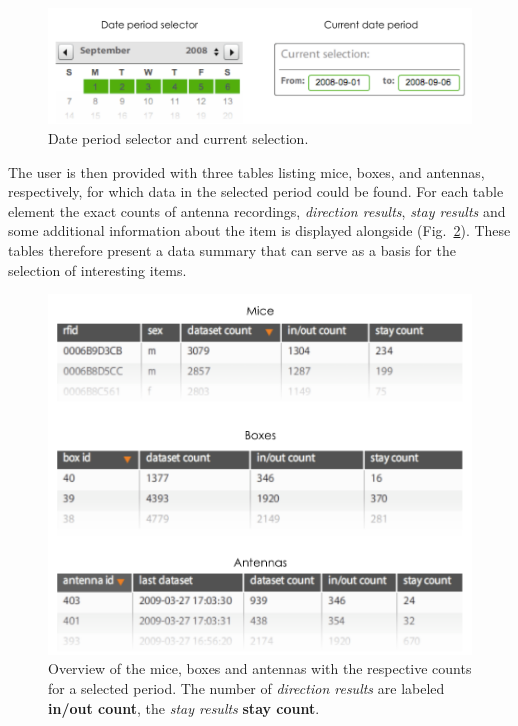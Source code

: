 \begin{figure}[htpb]
\begin{center}
  \includegraphics[width=.75\textwidth]{assets/pdf/date_period.pdf}
  \caption[Date period selector]{Date period selector and current selection.}
  \label{fig:date_period}
\end{center}
\end{figure}

The user is then provided with three tables listing mice, boxes, and antennas, respectively, for which data in the selected period could be found. For each table element the exact counts of antenna recordings, \textit{direction results}, \textit{stay results} and some additional information about the item is displayed alongside (Fig.~\ref{fig:data_overview_with_count}). These tables therefore present a data summary that can serve as a basis for the selection of interesting items. 

\begin{figure}[!hbpt]
\begin{center}
  \includegraphics[width=.66\textwidth]{assets/pdf/overview_list.pdf}
  \caption[Overview of the summarized data for mice, boxes and antennas within a date period]{Overview of the mice, boxes and antennas with the respective counts for a selected period. The number of \textit{direction results} are labeled \textbf{in/out count}, the \textit{stay results}  \textbf{stay count}.}
  \label{fig:data_overview_with_count}
\end{center}
\end{figure}

